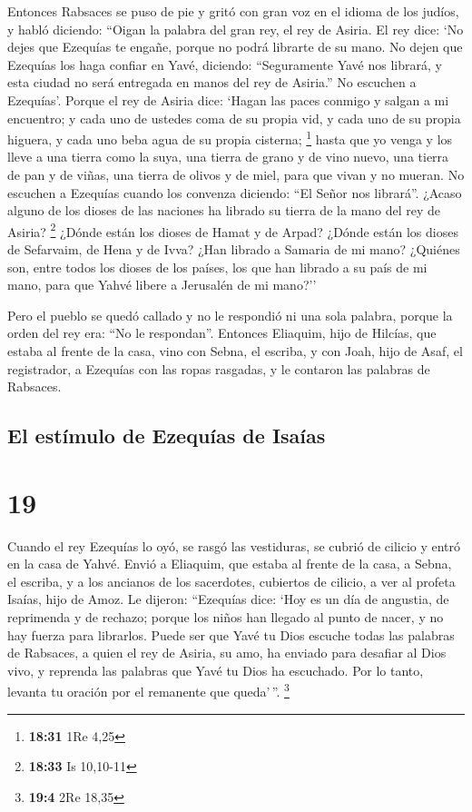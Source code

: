  Entonces Rabsaces se puso de pie y gritó con gran voz en
el idioma de los judíos, y habló diciendo: ``Oigan la palabra del gran
rey, el rey de Asiria.  El rey dice: `No dejes que
Ezequías te engañe, porque no podrá librarte de su mano. 
No dejen que Ezequías los haga confiar en Yavé, diciendo: ``Seguramente
Yavé nos librará, y esta ciudad no será entregada en manos del rey de
Asiria.''  No escuchen a Ezequías'. Porque el rey de
Asiria dice: `Hagan las paces conmigo y salgan a mi encuentro; y cada
uno de ustedes coma de su propia vid, y cada uno de su propia higuera, y
cada uno beba agua de su propia cisterna; \footnote{\textbf{18:31} 1Re
  4,25}  hasta que yo venga y los lleve a una tierra como
la suya, una tierra de grano y de vino nuevo, una tierra de pan y de
viñas, una tierra de olivos y de miel, para que vivan y no mueran. No
escuchen a Ezequías cuando los convenza diciendo: ``El Señor nos
librará''.  ¿Acaso alguno de los dioses de las naciones
ha librado su tierra de la mano del rey de Asiria? \footnote{\textbf{18:33}
  Is 10,10-11}  ¿Dónde están los dioses de Hamat y de
Arpad? ¿Dónde están los dioses de Sefarvaim, de Hena y de Ivva? ¿Han
librado a Samaria de mi mano?  ¿Quiénes son, entre todos
los dioses de los países, los que han librado a su país de mi mano, para
que Yahvé libere a Jerusalén de mi mano?''

 Pero el pueblo se quedó callado y no le respondió ni una
sola palabra, porque la orden del rey era: ``No le respondan''.
 Entonces Eliaquim, hijo de Hilcías, que estaba al frente
de la casa, vino con Sebna, el escriba, y con Joah, hijo de Asaf, el
registrador, a Ezequías con las ropas rasgadas, y le contaron las
palabras de Rabsaces.

\hypertarget{el-estuxedmulo-de-ezequuxedas-de-isauxedas}{%
\subsection{El estímulo de Ezequías de
Isaías}\label{el-estuxedmulo-de-ezequuxedas-de-isauxedas}}

\hypertarget{section-18}{%
\section{19}\label{section-18}}

 Cuando el rey Ezequías lo oyó, se rasgó las vestiduras,
se cubrió de cilicio y entró en la casa de Yahvé.  Envió a
Eliaquim, que estaba al frente de la casa, a Sebna, el escriba, y a los
ancianos de los sacerdotes, cubiertos de cilicio, a ver al profeta
Isaías, hijo de Amoz.  Le dijeron: ``Ezequías dice: `Hoy
es un día de angustia, de reprimenda y de rechazo; porque los niños han
llegado al punto de nacer, y no hay fuerza para librarlos.
 Puede ser que Yavé tu Dios escuche todas las palabras de
Rabsaces, a quien el rey de Asiria, su amo, ha enviado para desafiar al
Dios vivo, y reprenda las palabras que Yavé tu Dios ha escuchado. Por lo
tanto, levanta tu oración por el remanente que queda'\,''. \footnote{\textbf{19:4}
  2Re 18,35}

